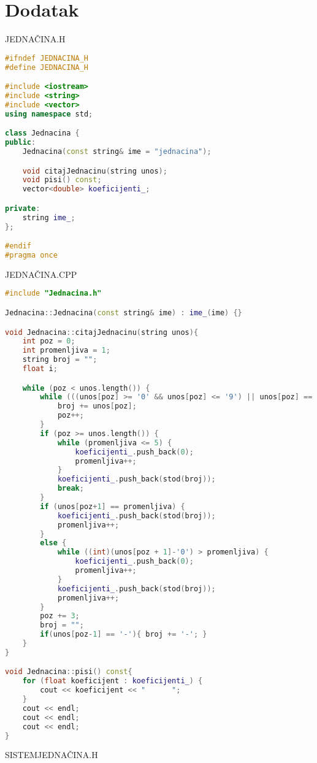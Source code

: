 \documentclass[12pt,leqno,a4paper]{article}
\begin{document}
\section{Dodatak}

JEDNA\v CINA.H
\begin{lstlisting}[language=C++ ]
#ifndef JEDNACINA_H
#define JEDNACINA_H

#include <iostream>
#include <string>
#include <vector>
using namespace std;

class Jednacina {
public:
	Jednacina(const string& ime = "jednacina");

	void citajJednacinu(string unos);
	void pisi() const;
	vector<double> koeficijenti_;

private:
	string ime_;
};

#endif
#pragma once


\end{lstlisting}
JEDNA\v CINA.CPP
\begin{lstlisting}[language=C++ ]
#include "Jednacina.h"

Jednacina::Jednacina(const string& ime) : ime_(ime) {}

void Jednacina::citajJednacinu(string unos){
	int poz = 0;
	int promenljiva = 1;
	string broj = "";
	float i;

	while (poz < unos.length()) {
		while (((unos[poz] >= '0' && unos[poz] <= '9') || unos[poz] == '.' || unos[poz] == '-') && poz < unos.length()) {
			broj += unos[poz];
			poz++;
		}
		if (poz >= unos.length()) { 
			while (promenljiva <= 5) {
				koeficijenti_.push_back(0);
				promenljiva++;
			}
			koeficijenti_.push_back(stod(broj));
			break; 
		}
		if (unos[poz+1] == promenljiva) {
			koeficijenti_.push_back(stod(broj));
			promenljiva++;
		}
		else {
			while ((int)(unos[poz + 1]-'0') > promenljiva) {
				koeficijenti_.push_back(0);
				promenljiva++;
			}
			koeficijenti_.push_back(stod(broj));
			promenljiva++;
		}
		poz += 3;
		broj = "";
		if(unos[poz-1] == '-'){ broj += '-'; }
	}
}

void Jednacina::pisi() const{
	for (float koeficijent : koeficijenti_) {
		cout << koeficijent << "	  ";
	}
	cout << endl;
	cout << endl;
	cout << endl;
}


\end{lstlisting}
SISTEMJEDNA\v CINA.H
\end{document}
